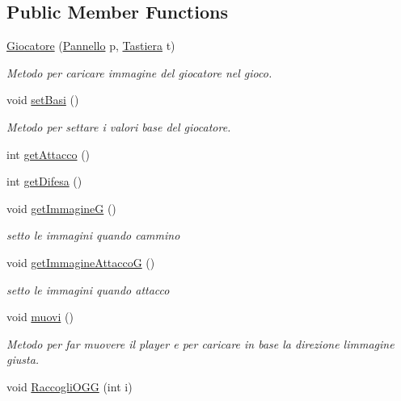 \subsection*{Public Member Functions}
\begin{DoxyCompactItemize}
\item 
\hyperlink{class_entita_1_1_giocatore_ab9baa50cd99d9d2e399e9e3ad53159c6}{Giocatore} (\hyperlink{classa_1_1survival_1_1game_1_1_pannello}{Pannello} p, \hyperlink{classa_1_1survival_1_1game_1_1_tastiera}{Tastiera} t)
\begin{DoxyCompactList}\small\item\em Metodo per caricare immagine del giocatore nel gioco. \end{DoxyCompactList}\item 
void \hyperlink{class_entita_1_1_giocatore_a38a75be5807f155ff640bfa73518421d}{set\+Basi} ()
\begin{DoxyCompactList}\small\item\em Metodo per settare i valori base del giocatore. \end{DoxyCompactList}\item 
int \hyperlink{class_entita_1_1_giocatore_aafeab2e7e3b0e536c594b5aef8c31683}{get\+Attacco} ()
\item 
int \hyperlink{class_entita_1_1_giocatore_a5cd7986fb28ad7739710f90e464b1b27}{get\+Difesa} ()
\item 
void \hyperlink{class_entita_1_1_giocatore_abac365540bed82b4025e8e845b779c72}{get\+ImmagineG} ()
\begin{DoxyCompactList}\small\item\em setto le immagini quando cammino \end{DoxyCompactList}\item 
void \hyperlink{class_entita_1_1_giocatore_acc1691c076ed9335796eac421dce845f}{get\+Immagine\+AttaccoG} ()
\begin{DoxyCompactList}\small\item\em setto le immagini quando attacco \end{DoxyCompactList}\item 
void \hyperlink{class_entita_1_1_giocatore_a1fe2f184b3cc7345c6a0f08d183a1d0b}{muovi} ()
\begin{DoxyCompactList}\small\item\em Metodo per far muovere il player e per caricare in base la direzione l\textquotesingle{}immagine giusta. \end{DoxyCompactList}\item 
void \hyperlink{class_entita_1_1_giocatore_a9ba65e7d25928d62218cf14bee3c0273}{Raccogli\+O\+GG} (int i)

\end{DoxyCompactItemize}
